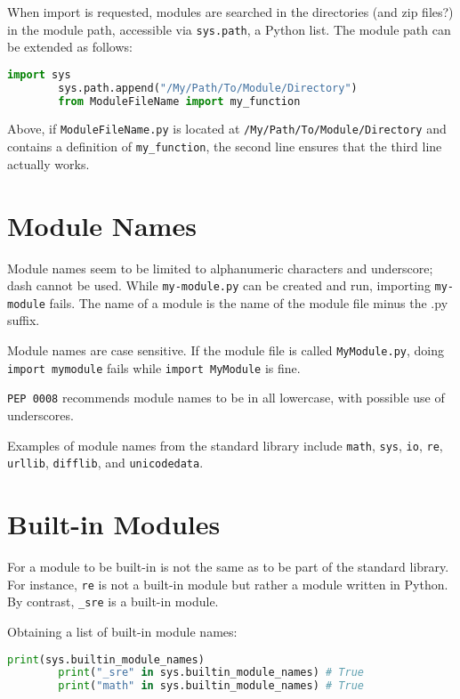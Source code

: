 \documentclass{article}
\begin{document}
	When import is requested, modules are searched in the directories (and zip files?) in the module path, accessible via \texttt{sys.path}, a Python list. The module path can be extended as follows:
	
	\begin{lstlisting}[language=Python]
		import sys
		sys.path.append("/My/Path/To/Module/Directory")
		from ModuleFileName import my_function
	\end{lstlisting}
	
Above, if \texttt{ModuleFileName.py} is located at \texttt{/My/Path/To/Module/Directory} and contains a definition of \texttt{my\_function}, the second line ensures that the third line actually works.

	
	\section{Module Names}
	
	Module names seem to be limited to alphanumeric characters and underscore; dash cannot be used. While \texttt{my-module.py} can be created and run, importing \texttt{my-module} fails. The name of a module is the name of the module file minus the .py suffix.
	
	Module names are case sensitive. If the module file is called \texttt{MyModule.py}, doing \texttt{import mymodule} fails while \texttt{import MyModule} is fine.
	
	\texttt{PEP 0008} recommends module names to be in all lowercase, with possible use of underscores.
	
	Examples of module names from the standard library include \texttt{math}, \texttt{sys}, \texttt{io}, \texttt{re}, \texttt{urllib}, \texttt{difflib}, and \texttt{unicodedata}.
	
	\section{Built-in Modules}
	
	For a module to be built-in is not the same as to be part of the standard library. For instance, \texttt{re} is not a built-in module but rather a module written in Python. By contrast, \texttt{\_sre} is a built-in module.
	
	Obtaining a list of built-in module names:
	
	\begin{lstlisting}[language=Python]
		print(sys.builtin_module_names)
		print("_sre" in sys.builtin_module_names) # True
		print("math" in sys.builtin_module_names) # True
	\end{lstlisting}
	
\end{document}
